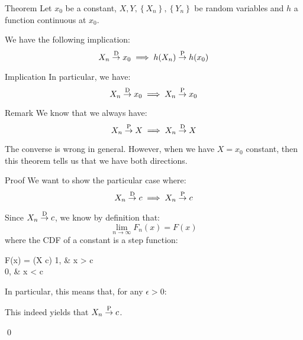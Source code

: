 \documentclass[a4paper]{article}
\begin{document}
\begin{parag}{Theorem}
    Let $x_0$ be a constant, $X, Y, \left\{X_n\right\}, \left\{Y_n\right\}$ be random variables and $h$ a function continuous at $x_0$.

    We have the following implication:
    \[X_n \over{\to}{D} x_0 \implies h\left(X_n\right) \over{\to}{P} h\left(x_0\right)\]
    
    \begin{subparag}{Implication}
        In particular, we have:
        \[X_n \over{\to}{D} x_0 \implies X_n \over{\to}{P} x_0\]
    \end{subparag}
    
    \begin{subparag}{Remark}
        We know that we always have: 
        \[X_n \over{\to}{P} X \implies X_n \over{\to}{D} X\]
        
        The converse is wrong in general. However, when we have $X = x_0$ constant, then this theorem tells us that we have both directions.
    \end{subparag}

    \begin{subparag}{Proof}
        We want to show the particular case where: 
        \[X_n \over{\to}{D} c \implies X_n\over{\to}{P} c\]
        
        Since $X_n \over{\to}{D} c$, we know by definition that: 
        \[\lim_{n \to \infty} F_n\left(x\right) = F\left(x\right)\]
        where the CDF of a constant is a step function:
        \begin{functionbypart}{F\left(x\right) = \prob\left(X \leq c\right)}
            1, & x > c \\
            0, & x < c 
        \end{functionbypart}

        In particular, this means that, for any $\epsilon > 0$: 

        This indeed yields that $X_n \over{\to}{P} c$.

        \qed
    \end{subparag}
    
\end{parag}
\end{document}
